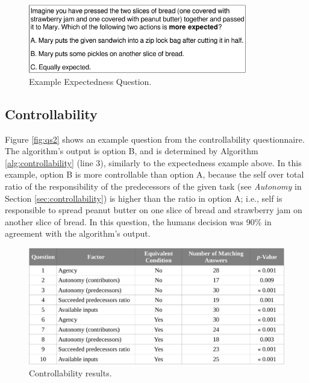 \documentclass[12pt]{report}
\begin{document}
\begin{figure}[tbh]
  \centering
  \includegraphics[width=0.85\textwidth]{figure/question-sample-croped.pdf}
  \caption{{\fontsize{9}{9}\selectfont Example Expectedness Question.}}
  \label{fig:qs1}
\end{figure}

\subsection{Controllability}
\label{sec:controllability-crowdsourcing}
Figure \ref{fig:qs2} shows an example question from the controllability
questionnaire. The algorithm's output is option B, and is determined by
Algorithm \ref{alg:controllability} (line 3), similarly to the expectedness
example above. In this example, option B is more controllable than option A,
because the self over total ratio of the responsibility of the predecessors of
the given task (see \textit{Autonomy} in Section \ref{sec:controllability}) is
higher than the ratio in option A; i.e., self is responsible to spread peanut
butter on one slice of bread and strawberry jam on another slice of bread. In
this question, the humans decision was 90\% in agreement with the algorithm's
output.

\begin{figure}[tbh]
  \centering
  \includegraphics[width=1\textwidth]{figure/controllability_result_croped.pdf}
  \caption{Controllability results.}
  \label{fig:controllability_result}
\end{figure}
\end{document}
